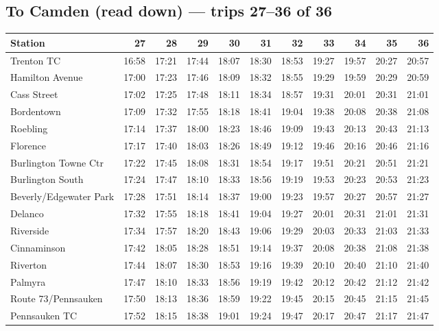 \subsection*{To Camden (read down) --- trips 27--36 of 36}
\begin{center}\footnotesize\setlength{\tabcolsep}{3pt}\begin{tabular}{@{}lrrrrrrrrrr@{}}\toprule
Station & 27 & 28 & 29 & 30 & 31 & 32 & 33 & 34 & 35 & 36 \\\midrule
Trenton TC & 16:58 & 17:21 & 17:44 & 18:07 & 18:30 & 18:53 & 19:27 & 19:57 & 20:27 & 20:57 \\
Hamilton Avenue & 17:00 & 17:23 & 17:46 & 18:09 & 18:32 & 18:55 & 19:29 & 19:59 & 20:29 & 20:59 \\
Cass Street & 17:02 & 17:25 & 17:48 & 18:11 & 18:34 & 18:57 & 19:31 & 20:01 & 20:31 & 21:01 \\
Bordentown & 17:09 & 17:32 & 17:55 & 18:18 & 18:41 & 19:04 & 19:38 & 20:08 & 20:38 & 21:08 \\
Roebling & 17:14 & 17:37 & 18:00 & 18:23 & 18:46 & 19:09 & 19:43 & 20:13 & 20:43 & 21:13 \\
Florence & 17:17 & 17:40 & 18:03 & 18:26 & 18:49 & 19:12 & 19:46 & 20:16 & 20:46 & 21:16 \\
Burlington Towne Ctr & 17:22 & 17:45 & 18:08 & 18:31 & 18:54 & 19:17 & 19:51 & 20:21 & 20:51 & 21:21 \\
Burlington South & 17:24 & 17:47 & 18:10 & 18:33 & 18:56 & 19:19 & 19:53 & 20:23 & 20:53 & 21:23 \\
Beverly/Edgewater Park & 17:28 & 17:51 & 18:14 & 18:37 & 19:00 & 19:23 & 19:57 & 20:27 & 20:57 & 21:27 \\
Delanco & 17:32 & 17:55 & 18:18 & 18:41 & 19:04 & 19:27 & 20:01 & 20:31 & 21:01 & 21:31 \\
Riverside & 17:34 & 17:57 & 18:20 & 18:43 & 19:06 & 19:29 & 20:03 & 20:33 & 21:03 & 21:33 \\
Cinnaminson & 17:42 & 18:05 & 18:28 & 18:51 & 19:14 & 19:37 & 20:08 & 20:38 & 21:08 & 21:38 \\
Riverton & 17:44 & 18:07 & 18:30 & 18:53 & 19:16 & 19:39 & 20:10 & 20:40 & 21:10 & 21:40 \\
Palmyra & 17:47 & 18:10 & 18:33 & 18:56 & 19:19 & 19:42 & 20:12 & 20:42 & 21:12 & 21:42 \\
Route 73/Pennsauken & 17:50 & 18:13 & 18:36 & 18:59 & 19:22 & 19:45 & 20:15 & 20:45 & 21:15 & 21:45 \\
Pennsauken TC & 17:52 & 18:15 & 18:38 & 19:01 & 19:24 & 19:47 & 20:17 & 20:47 & 21:17 & 21:47 \\

\end{tabular}
\end{center}
